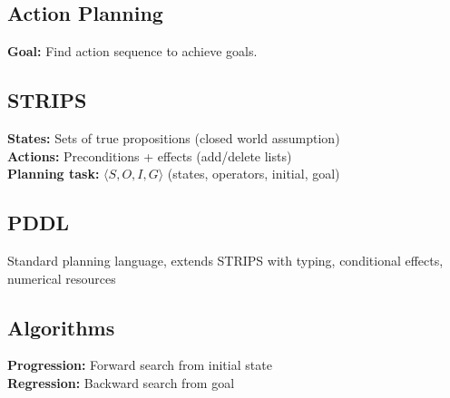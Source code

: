 \documentclass[8pt,landscape,a4paper]{article}
\begin{document}
\begin{multicols*}{3}



\section{Action Planning}
\textbf{Goal:} Find action sequence to achieve goals.

\subsection{STRIPS}
\textbf{States:} Sets of true propositions (closed world assumption)\\
\textbf{Actions:} Preconditions + effects (add/delete lists)\\
\textbf{Planning task:} $\langle S,O,I,G\rangle$ (states, operators, initial, goal)

\subsection{PDDL}
Standard planning language, extends STRIPS with typing, conditional effects, numerical resources

\subsection{Algorithms}
\textbf{Progression:} Forward search from initial state\\
\textbf{Regression:} Backward search from goal


\end{multicols*}
\end{document}
